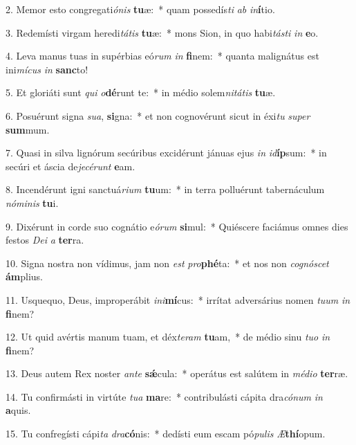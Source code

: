 2. Memor esto congregati\textit{ó}\textit{nis} \textbf{tu}æ:~*  quam possedís\textit{ti} \textit{ab} \textit{in}\textbf{í}tio.\

3. Redemísti virgam heredi\textit{tá}\textit{tis} \textbf{tu}æ:~*  mons Sion, in quo habi\textit{tás}\textit{ti} \textit{in} \textbf{e}o.\

4. Leva manus tuas in supérbias eó\textit{rum} \textit{in} \textbf{fi}nem:~*  quanta malignátus est ini\textit{mí}\textit{cus} \textit{in} \textbf{sanc}to!\

5. Et gloriáti sunt \textit{qui} \textit{o}\textbf{dé}runt te:~*  in médio solem\textit{ni}\textit{tá}\textit{tis} \textbf{tu}æ.\

6. Posuérunt signa \textit{su}\textit{a}, \textbf{si}gna:~*  et non cognovérunt sicut in éxi\textit{tu} \textit{su}\textit{per} \textbf{sum}mum.\

7. Quasi in silva lignórum secúribus excidérunt jánuas ejus \textit{in} \textit{id}\textbf{íp}sum:~*  in secúri et áscia de\textit{je}\textit{cé}\textit{runt} \textbf{e}am.\

8. Incendérunt igni sanctuá\textit{ri}\textit{um} \textbf{tu}um:~*  in terra polluérunt tabernáculum \textit{nó}\textit{mi}\textit{nis} \textbf{tu}i.\

9. Dixérunt in corde suo cognátio e\textit{ó}\textit{rum} \textbf{si}mul:~*  Quiéscere faciámus omnes dies festos \textit{De}\textit{i} \textit{a} \textbf{ter}ra.\

10. Signa nostra non vídimus, jam non \textit{est} \textit{pro}\textbf{phé}ta:~*  et nos non \textit{co}\textit{gnó}\textit{scet} \textbf{ám}plius.\

11. Usquequo, Deus, improperábit \textit{in}\textit{i}\textbf{mí}cus:~*  irrítat adversárius nomen \textit{tu}\textit{um} \textit{in} \textbf{fi}nem?\

12. Ut quid avértis manum tuam, et déx\textit{te}\textit{ram} \textbf{tu}am,~*  de médio sinu \textit{tu}\textit{o} \textit{in} \textbf{fi}nem?\

13. Deus autem Rex noster \textit{an}\textit{te} \textbf{sǽ}cula:~*  operátus est salútem in \textit{mé}\textit{di}\textit{o} \textbf{ter}ræ.\

14. Tu confirmásti in virtúte \textit{tu}\textit{a} \textbf{ma}re:~*  contribulásti cápita dra\textit{có}\textit{num} \textit{in} \textbf{a}quis.\

15. Tu confregísti cápi\textit{ta} \textit{dra}\textbf{có}nis:~*  dedísti eum escam pó\textit{pu}\textit{lis} \textit{Æ}\textbf{thí}opum.\


